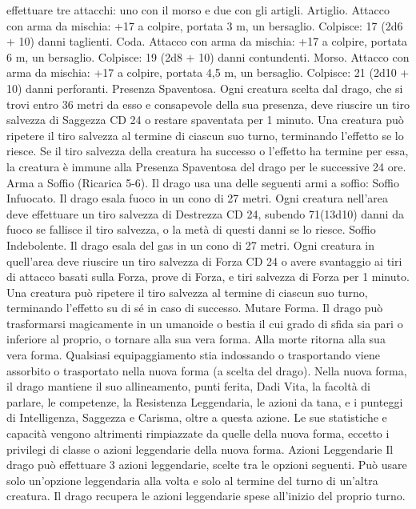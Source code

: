 \begin{multicols}{2}
effettuare tre attacchi: uno con il morso e due con gli artigli.
Artiglio. Attacco con arma da mischia: +17 a colpire, portata 3
m, un bersaglio.
Colpisce: 17 (2d6 + 10) danni taglienti.
Coda. Attacco con arma da mischia: +17 a colpire, portata 6 m,
un bersaglio.
Colpisce: 19 (2d8 + 10) danni contundenti.
Morso. Attacco con arma da mischia: +17 a colpire, portata 4,5
m, un bersaglio.
Colpisce: 21 (2d10 + 10) danni perforanti.
Presenza Spaventosa. Ogni creatura scelta dal drago, che si trovi
entro 36 metri da esso e consapevole della sua presenza, deve
riuscire un tiro salvezza di Saggezza CD 24 o restare spaventata per
1 minuto. Una creatura può ripetere il tiro salvezza al termine di
ciascun suo turno, terminando l’effetto se lo riesce. Se il tiro salvezza
della creatura ha successo o l’effetto ha termine per essa, la creatura è
immune alla Presenza Spaventosa del drago per le successive 24 ore.
Arma a Soffio (Ricarica 5-6). Il drago usa una delle seguenti armi
a soffio:
Soffio Infuocato. Il drago esala fuoco in un cono di 27 metri. Ogni
creatura nell’area deve effettuare un tiro salvezza di Destrezza CD
24, subendo 71(13d10) danni da fuoco se fallisce il tiro salvezza, o la
metà di questi danni se lo riesce.
Soffio Indebolente. Il drago esala del gas in un cono di 27 metri. Ogni
creatura in quell’area deve riuscire un tiro salvezza di Forza CD 24 o
avere svantaggio ai tiri di attacco basati sulla Forza, prove di Forza, e
tiri salvezza di Forza per 1 minuto. Una creatura può ripetere il tiro
salvezza al termine di ciascun suo turno, terminando l’effetto su di sé
in caso di successo.
Mutare Forma. Il drago può trasformarsi magicamente in un
umanoide o bestia il cui grado di sfida sia pari o inferiore al proprio,
o tornare alla sua vera forma. Alla morte ritorna alla sua vera forma.
Qualsiasi equipaggiamento stia indossando o trasportando viene
assorbito o trasportato nella nuova forma (a scelta del drago).
Nella nuova forma, il drago mantiene il suo allineamento, punti
ferita, Dadi Vita, la facoltà di parlare, le competenze, la Resistenza
Leggendaria, le azioni da tana, e i punteggi di Intelligenza, Saggezza
e Carisma, oltre a questa azione. Le sue statistiche e capacità
vengono altrimenti rimpiazzate da quelle della nuova forma, eccetto i
privilegi di classe o azioni leggendarie della nuova forma.
Azioni Leggendarie
Il drago può effettuare 3 azioni leggendarie, scelte tra le opzioni
seguenti. Può usare solo un’opzione leggendaria alla volta e solo
al termine del turno di un’altra creatura. Il drago recupera le
azioni leggendarie spese all’inizio del proprio turno.

\end{multicols}

